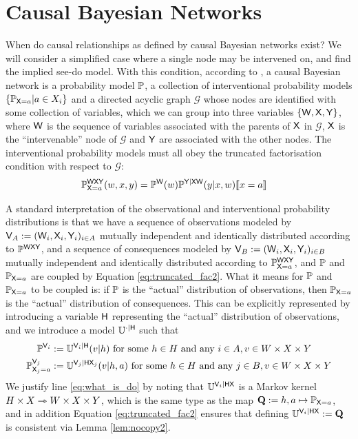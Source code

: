 

\section{Causal Bayesian Networks}\label{sec:CBN}

When do causal relationships as defined by causal Bayesian networks exist? We will consider a simplified case where a single node may be intervened on, and find the implied see-do model. With this condition, according to \citet{pearl_causality:_2009}, a causal Bayesian network is a probability model $\mathbb{P}$, a collection of interventional probability models $\{\mathbb{P}_{\mathsf{X}=a}|a\in X_i\}$ and a directed acyclic graph $\mathcal{G}$ whose nodes are identified with some collection of variables, which we can group into three variables $\{\mathsf{W},\mathsf{X},\mathsf{Y}\}$, where $\mathsf{W}$ is the sequence of variables associated with the parents of $\mathsf{X}$ in $\mathcal{G}$, $\mathsf{X}$ is the ``intervenable'' node of $\mathcal{G}$ and $\mathsf{Y}$ are associated with the other nodes. The interventional probability models must all obey the truncated factorisation condition with respect to $\mathcal{G}$:
\begin{align}
    \mathbb{P}_{\mathsf{X}=a}^{\mathsf{W}\mathsf{X}\mathsf{Y}}(w,x,y) &= \mathbb{P}^{\mathsf{W}}(w)\mathbb{P}^{\mathsf{Y}|\mathsf{XW}}(y|x,w)\llbracket x=a \rrbracket\label{eq:truncated_fac2}
\end{align}

A standard interpretation of the observational and interventional probability distributions is that we have a sequence of observations modeled by $\mathsf{V}_A:=(\mathsf{W}_i,\mathsf{X}_i,\mathsf{Y}_i)_{i\in A}$ mutually independent and identically distributed according to $\mathbb{P}^{\mathsf{WXY}}$, and a sequence of consequences modeled by $\mathsf{V}_B:=(\mathsf{W}_i,\mathsf{X}_i,\mathsf{Y}_i)_{i\in B}$ mutually independent and identically distributed according to $\mathbb{P}_{\mathsf{X}=a}^{\mathsf{WXY}}$, and $\mathbb{P}$ and $\mathbb{P}_{\mathsf{X}=a}$ are coupled by Equation \ref{eq:truncated_fac2}. What it means for $\mathbb{P}$ and $\mathbb{P}_{\mathsf{X}=a}$ to be coupled is: if $\mathbb{P}$ is the ``actual'' distribution of observations, then $\mathbb{P}_{\mathsf{X}=a}$ is the ``actual'' distribution of consequences. This can be explicitly represented by introducing a variable $\mathsf{H}$ representing the ``actual'' distribution of observations, and we introduce a model $\mathbb{U}^{\cdot|\mathsf{H}}$ such that
\begin{align}
    \mathbb{P}^{\mathsf{V}_i}&:=\mathbb{U}^{\mathsf{V}_i|\mathsf{H}}(v|h)\text{ for some }h\in H\text{ and any }i\in A, v\in W\times X\times Y\label{eq:what_is_p}\\
    \mathbb{P}_{\mathsf{X}_j=a}^{\mathsf{V}_j}&:=\mathbb{U}^{\mathsf{V}_j|\mathsf{HX}_j}(v|h,a)\text{ for some }h\in H\text{ and any }j\in B, v\in W\times X\times Y\label{eq:what_is_do}
\end{align}
We justify line \ref{eq:what_is_do} by noting that $\mathbb{U}^{\mathsf{V}_i|\mathsf{HX}}$ is a Markov kernel $H\times X\rightarrowtriangle W\times X\times Y$, which is the same type as the map $\mathbf{Q}:=h,a\mapsto \mathbb{P}_{\mathsf{X}=a}$, and in addition Equation \ref{eq:truncated_fac2} ensures that defining $\mathbb{U}^{\mathsf{V}_i|\mathsf{HX}}:=\mathbf{Q}$ is consistent via Lemma \ref{lem:nocopy2}.

